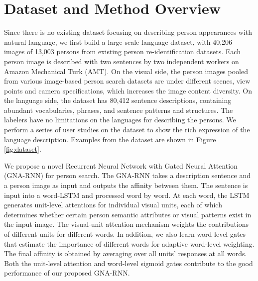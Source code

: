 \section{Dataset and Method Overview} %
\label{sec:ps-overview}
Since there is no existing dataset focusing on describing person appearances with natural language, we first build a large-scale language dataset, with 40,206 images of 13,003 persons from existing person re-identification datasets. Each person image is described with two sentences by two independent workers on Amazon Mechanical Turk (AMT). On the visual side, the person images pooled from various image-based person search datasets are under different scenes, view points and camera specifications, which increases the image content diversity. On the language side, the dataset has 80,412 sentence descriptions, containing abundant vocabularies, phrases, and sentence patterns and structures. The labelers have no limitations on the languages for describing the persons. We perform a series of user studies on the dataset to show the rich expression of the language description. Examples from the dataset are shown in Figure \ref{fig:dataset}.

We propose a novel Recurrent Neural Network with Gated Neural Attention (GNA-RNN) for person search. The GNA-RNN takes a description sentence and a person image as input and outputs the affinity between them. The sentence is input into a word-LSTM and processed word by word. At each word, the LSTM generates unit-level attentions for individual visual units, each of which determines whether certain person semantic attributes or visual patterns exist in the input image. The visual-unit attention mechanism weights the contributions of different units for different words. In addition, we also learn word-level gates that estimate the importance of different words for adaptive word-level weighting.  The final affinity is obtained by averaging over all units' responses at all words. Both the unit-level attention and word-level sigmoid gates contribute to the good performance of our proposed GNA-RNN.




